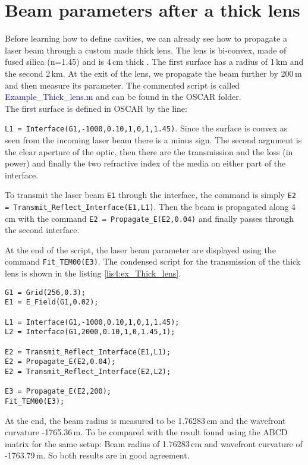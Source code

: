 \section{Beam parameters after a thick lens}

Before learning how to define cavities, we can already see how to propagate a laser beam through a custom made thick lens. The lens is bi-convex, made of fused silica (n=1.45) and is 4\,cm thick . The first surface has a radius of 1\,km and the second 2\,km. At the exit of the lens, we propagate the beam further by 200\,m and then measure its parameter. The commented script is called \textcolor{blue}{Example\_Thick\_lens.m} and can be found in the OSCAR folder.\\

The first surface is defined in OSCAR by the line:

\noindent \verb|L1 = Interface(G1,-1000,0.10,1,0,1,1.45)|. Since the surface is convex as seen from the incoming laser beam there is a minus sign. The second argument is the clear aperture of the optic, then there are the transmission and the loss (in power) and finally the two refractive index of the media on either part of the interface.

To transmit the laser beam \verb|E1| through the interface, the command is simply \verb|E2 = Transmit_Reflect_Interface(E1,L1)|. Then the beam is propagated along 4\,cm with the command \verb|E2 = Propagate_E(E2,0.04)| and finally passes through the second interface.

At the end of the script, the laser beam parameter are displayed using the command \verb|Fit_TEM00(E3)|. The condensed script for the transmission of the thick lens is shown in the listing \ref{lis4:ex_Thick_lens}.\\

\begin{lstlisting}[float=htp,caption=Example of OSCAR script to simulate a thick lens\label{lis4:ex_Thick_lens},frame=lines]
G1 = Grid(256,0.3);
E1 = E_Field(G1,0.02);

L1 = Interface(G1,-1000,0.10,1,0,1,1.45);
L2 = Interface(G1,2000,0.10,1,0,1.45,1);

E2 = Transmit_Reflect_Interface(E1,L1);
E2 = Propagate_E(E2,0.04);
E2 = Transmit_Reflect_Interface(E2,L2);

E3 = Propagate_E(E2,200);
Fit_TEM00(E3);
\end{lstlisting}

At the end, the beam radius is measured to be 1.76283\,cm and the wavefront curvature -1765.36\,m. To be compared with the result found using the ABCD matrix for the same setup: Beam radius of 1.76283\,cm and wavefront curvature of -1763.79\,m. So both results are in good agreement.

